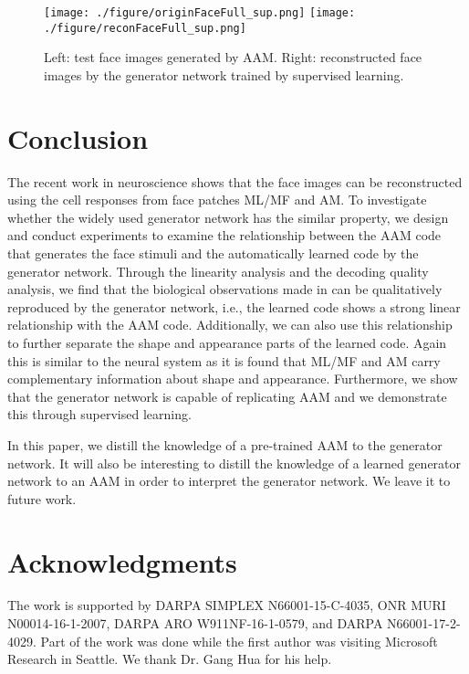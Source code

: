 \documentclass{article}
\begin{document}
\begin{figure}[h]
	\begin{center}
		\texttt{[image: ./figure/originFaceFull\_sup.png]}\hspace{0.5mm}
		\texttt{[image: ./figure/reconFaceFull\_sup.png]}
		\caption{Left: test face images generated by AAM. Right: reconstructed face images by the generator network trained by supervised learning.}
		\label{fig:AAM_rep}
	\end{center}
\end{figure}

\section{Conclusion}%
The recent work in neuroscience \cite{chang2017code} shows that the face images can be  reconstructed using the cell responses from face patches ML/MF and AM. To investigate whether the widely used generator network has the similar property, we design and conduct experiments to examine the relationship between  the AAM code that generates the face stimuli and the automatically learned code by the generator network. Through the linearity analysis and the decoding quality analysis, we  find that the biological observations made in \cite{chang2017code} can be qualitatively reproduced by the generator network, i.e., the learned code shows a strong linear relationship with the AAM code. Additionally, we can also use this relationship to further separate the shape and appearance parts of the learned code. Again this is similar to the neural system as it is found that ML/MF and AM carry complementary information about shape and appearance.
Furthermore, we show that the generator network is capable of replicating AAM and we demonstrate this through supervised learning.

In this paper, we distill the knowledge of a pre-trained AAM to the generator network. It will also be interesting to distill the knowledge of a learned generator network to an AAM in order to interpret the generator network. We leave it to future work.


\section*{Acknowledgments}

The work is supported by DARPA SIMPLEX N66001-15-C-4035,  ONR MURI N00014-16-1-2007, DARPA ARO W911NF-16-1-0579, and DARPA  N66001-17-2-4029. Part of the work was done while the first author was visiting Microsoft Research in Seattle. We thank Dr. Gang Hua for his help.



\end{document}
